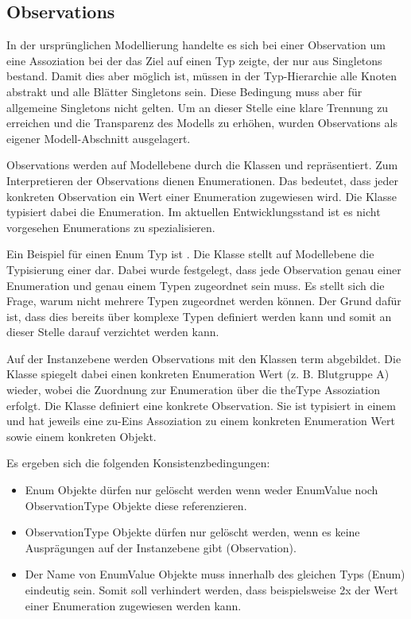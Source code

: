 \subsection{Observations}\label{Observations}
In der ursprünglichen Modellierung handelte es sich bei einer Observation um eine Assoziation bei der das Ziel auf einen 
Typ zeigte, der nur aus Singletons bestand. Damit dies aber möglich ist, müssen in der Typ-Hierarchie alle Knoten 
abstrakt und alle Blätter Singletons sein. Diese Bedingung muss aber für allgemeine Singletons nicht gelten. Um an dieser 
Stelle eine klare Trennung zu erreichen und die Transparenz des Modells zu erhöhen, wurden Observations als eigener Modell-Abschnitt ausgelagert.


Observations werden auf Modellebene durch die Klassen  und  repräsentiert. 
Zum Interpretieren der Observations dienen Enumerationen. Das bedeutet, dass jeder konkreten Observation
ein Wert einer Enumeration zugewiesen wird. Die Klasse  typisiert dabei die Enumeration. 
Im aktuellen Entwicklungsstand ist es nicht vorgesehen Enumerations zu spezialisieren.

Ein Beispiel für einen Enum Typ ist . Die Klasse  stellt auf Modellebene die 
Typisierung einer  dar. Dabei wurde festgelegt, dass jede Observation genau einer Enumeration 
und genau einem Typen zugeordnet sein muss. Es stellt sich die Frage, warum nicht mehrere Typen zugeordnet werden können. 
Der Grund dafür ist, dass dies bereits über komplexe Typen definiert werden kann und somit an dieser Stelle darauf verzichtet werden kann.

Auf der Instanzebene werden Observations mit den Klassen  term  abgebildet. 
Die Klasse  spiegelt dabei einen konkreten Enumeration Wert (z. B. Blutgruppe A) wieder, 
wobei die Zuordnung zur Enumeration über die theType Assoziation erfolgt. Die Klasse  definiert eine konkrete Observation. 
Sie ist typisiert in einem  und hat jeweils eine zu-Eins Assoziation zu einem konkreten Enumeration Wert sowie einem konkreten Objekt.

Es ergeben sich die folgenden Konsistenzbedingungen:
\begin{itemize}
  \item Enum Objekte dürfen nur gelöscht werden wenn weder EnumValue noch ObservationType Objekte diese referenzieren.
  \item ObservationType Objekte dürfen nur gelöscht werden, wenn es keine Ausprägungen auf der Instanzebene gibt (Observation).
  \item Der Name von EnumValue Objekte muss innerhalb des gleichen Typs (Enum) eindeutig sein. Somit soll verhindert werden, dass beispielsweise 2x der Wert  einer Enumeration  zugewiesen werden kann.
\end{itemize}

